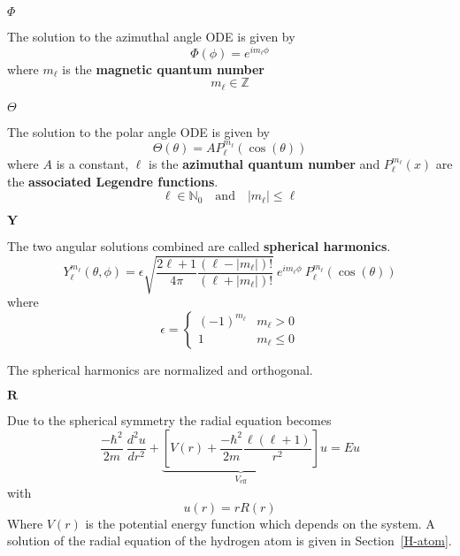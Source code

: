 \newpar{}
 $\Phi$

The solution to the azimuthal angle ODE is given by
\begin{equation*}
    \Phi(\phi)=e^{i m_\ell \phi}
\end{equation*}
where $m_\ell$ is the \textbf{magnetic quantum number}
\begin{equation*}
    m_\ell \in \mathbb{Z}
\end{equation*}

\newpar{}
 $\Theta$

The solution to the polar angle ODE is given by
\begin{equation*}
    \Theta(\theta) = A P_{\ell}^{m_\ell}(\cos(\theta))
\end{equation*}
where $A$ is a constant, $\ell$ is the \textbf{azimuthal quantum number} and $P_{\ell}^{m_\ell}(x)$ are the \textbf{associated Legendre functions}.
\begin{equation*}
    \ell \in \mathbb{N}_0 \quad \text{and} \quad |m_\ell| \leq \ell
\end{equation*}



\newpar{}
 $\mathbf{Y}$

The two angular solutions combined are called \textbf{spherical harmonics}.
\begin{equation*}
    Y_{\ell}^{m_\ell}(\theta, \phi) = \epsilon\sqrt{\frac{2\ell+1}{4\pi}\frac{(\ell-|m_\ell|)!}{(\ell+|m_\ell|)!}}\:e^{im_\ell\phi}\:P_{\ell}^{m_\ell}(\cos(\theta))
\end{equation*}
where
\begin{equation*}
    \epsilon = \begin{cases}
        {(-1)}^{m_\ell} & m_\ell > 0    \\
        1               & m_\ell \leq 0
    \end{cases}
\end{equation*}

The spherical harmonics are normalized and orthogonal.

\newpar{}
 $\mathbf{R}$

Due to the spherical symmetry the radial equation becomes
\begin{equation*}
    \frac{-\hbar^2}{2m}\:\frac{d^2u}{dr^2}+\underbrace{\left[V(r)+\frac{-\hbar^2}{2m}\frac{\ell(\ell+1)}{r^2}\right]}_{V_{\text{eff}}}u = Eu
\end{equation*}
with
\begin{equation*}
    u(r) = rR(r)
\end{equation*}
Where $V(r)$ is the potential energy function which depends on the system. A solution of the radial equation of the hydrogen atom is given in Section~\ref{H-atom}.

